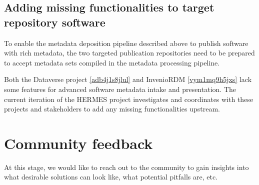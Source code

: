 \documentclass{article}
\begin{document}
\subsection{Adding missing functionalities to target repository software}\label{hdbbjo6li8d6}
To enable the metadata deposition pipeline described above to publish software with rich metadata, the two targeted publication repositories need to be prepared to accept metadata sets compiled in the metadata processing pipeline.

Both the Dataverse project \ref{adb4j1s8jlul} and InvenioRDM \ref{vym1mq9h5jxs} lack some features for advanced software metadata intake and presentation. The current iteration of the HERMES project investigates and coordinates with these projects and stakeholders to add any missing functionalities upstream.



\section{Community feedback}\label{yec0wia}
At this stage, we would like to reach out to the community to gain insights into what desirable solutions can look like, what potential pitfalls are, etc.
\end{document}
